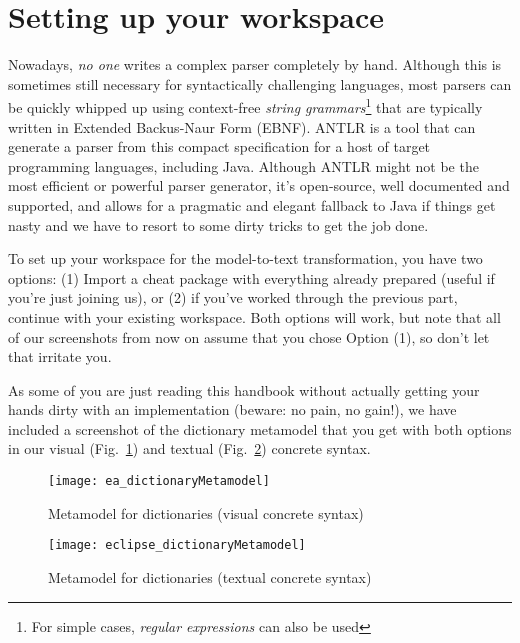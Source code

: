 \newpage
\section{Setting up your workspace}
\genHeader

Nowadays, \emph{no one} writes a complex parser completely by hand. Although this is sometimes still necessary for syntactically challenging languages, most
parsers can be quickly whipped up using context-free \emph{string grammars}\footnote{For simple cases, \emph{regular expressions} can also be used} that are
typically written in Extended Backus-Naur Form (EBNF). ANTLR is a tool that can generate a parser from this compact specification for
a host of target programming languages, including Java. Although ANTLR might not be the most efficient or powerful parser generator, it's open-source, well
documented and supported, and allows for a pragmatic and elegant fallback to Java if things get nasty and we have to resort to some dirty tricks to get the job
done.

To set up your workspace for the model-to-text transformation, you have two options: (1) Import a cheat package with everything already
prepared (useful if you're just joining us), or (2) if you've worked through the previous part, continue with your existing
workspace. Both options will work, but note that all of our screenshots from now on assume that you chose Option (1), so don't let that irritate you.

As some of you are just reading this handbook without actually getting your hands dirty with an implementation (beware: no pain, no gain!), we have included a
screenshot of the dictionary metamodel that you get with both options in our visual (Fig.~\ref{ea:dictLang}) and textual (Fig.~\ref{eclipse:dictLangMetamodel})
concrete syntax.

\vspace{0.5cm}

\begin{figure}[htbp]
\begin{centering}
  \texttt{[image: ea\_dictionaryMetamodel]}
  \caption{Metamodel for dictionaries (visual concrete syntax)}
  \label{ea:dictLang}
  \end{centering}
\end{figure}

\newpage

\begin{figure}[h!]
  \hspace{-1.5cm}
  \texttt{[image: eclipse\_dictionaryMetamodel]}
  \caption{Metamodel for dictionaries (textual concrete syntax)}
  \label{eclipse:dictLangMetamodel}
\end{figure}

